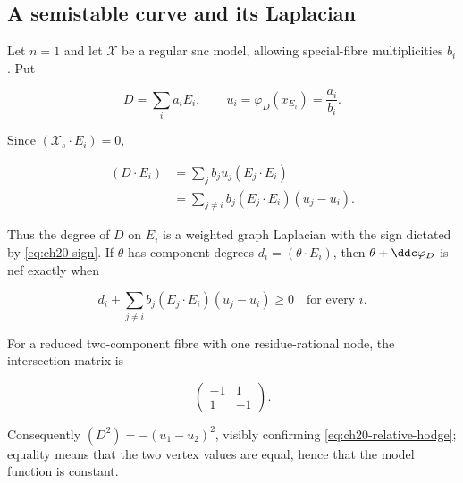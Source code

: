 \subsection{A semistable curve and its Laplacian}
\label{sec:ch20-ex-curve}

\begin{example}
\label{ex:ch20-semistable-curve}
Let $n=1$ and let $\mathcal X$ be a regular snc model, allowing
special-fibre multiplicities $b_i$.  Put

\begin{equation}
\label{eq:ch20-curve-values}
       D=\sum_i a_iE_i,
       \qquad u_i=\varphi_D(x_{E_i})=\frac{a_i}{b_i}.
\end{equation}

Since $(\mathcal X_s\cdot E_i)=0$,

\begin{equation}
\label{eq:ch20-graph-laplacian}
 \begin{aligned}
 (D\cdot E_i)
 &=\sum_j b_ju_j(E_j\cdot E_i)\\
 &=\sum_{j\neq i}b_j(E_j\cdot E_i)(u_j-u_i).
 \end{aligned}
\end{equation}

Thus the degree of $D$ on $E_i$ is a weighted graph Laplacian with the
sign dictated by \eqref{eq:ch20-sign}.  If $\theta$ has component degrees
$d_i=(\theta\cdot E_i)$, then $\theta+\ddc\varphi_D$ is nef exactly
when

\begin{equation}
\label{eq:ch20-curve-nef-test}
 d_i+\sum_{j\neq i}b_j(E_j\cdot E_i)(u_j-u_i)\geq0
 \quad\text{for every }i.
\end{equation}

For a reduced two-component fibre with one residue-rational node, the intersection matrix is

\begin{equation}
\label{eq:ch20-two-component-matrix}
              \begin{pmatrix}-1&1\\1&-1\end{pmatrix}.
\end{equation}

Consequently
$(D^2)=-(u_1-u_2)^2$, visibly confirming
\eqref{eq:ch20-relative-hodge}; equality means that the two vertex values
are equal, hence that the model function is constant.
\end{example}

